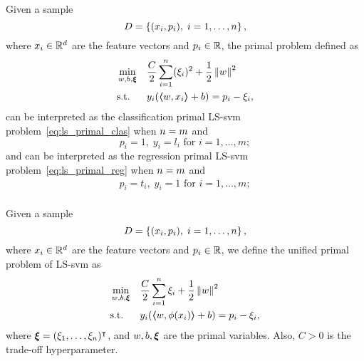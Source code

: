 \begin{lemma}
    Given a sample
    $$ D = \left\{(x_i, p_i), \; i=1, \ldots, n\right\} ,$$
    where $x_i \in \mathbb{R}^d$ are the feature vectors and $p_i \in \mathbb{R}$, 
    the primal problem defined as
    \begin{equation}
        \nonumber
        \begin{aligned}
            &\min_{w, b, \bm{\xi}} & & \frac{C}{2} \sum_{i=1}^n (\xi_i)^2 + \frac{1}{2} \left\lVert w\right\rVert^2 \\
            & \text{s.t.} & & y_i (\bm{\left\langle} w, x_i \bm{\right\rangle} + b) = p_i - \xi_i ,     
        \end{aligned}  
    \end{equation}
    can be interpreted as the classification primal LS-\acrshort{svm} problem~\eqref{eq:ls_primal_clas} when $n=m$ and
    $$ p_i = 1,\; y_i = l_i \text{ for } i=1, \ldots, m ;$$
    and can be interpreted as the regression primal LS-\acrshort{svm} problem~\eqref{eq:ls_primal_reg} when $n = m$ and
    \begin{equation}
        \nonumber
        \begin{aligned}
            p_i = t_i  ,\; y_i = 1 \text{ for } i=1, \ldots, m ; \\
        \end{aligned}
    \end{equation}
\end{lemma}
%
\begin{definition}
    Given a sample
    $$ D = \left\{(x_i, p_i), \; i=1, \ldots, n\right\} ,$$
    where $x_i \in \mathbb{R}^d$ are the feature vectors and $p_i \in \mathbb{R}$, 
    we define the unified primal problem of LS-\acrshort{svm} as
    \begin{equation}
        \label{eq:ls_primal}
        \begin{aligned}
            &\min_{w, b, \fv{\xi}} & & \frac{C}{2} \sum_{i=1}^\nsamples \xi_i + \frac{1}{2} \norm{w}^2 \\
            & \text{s.t.} & & y_i (\dotp{w}{\phi(x_i)} + b) = p_i - \xi_i ,      
        \end{aligned}  
    \end{equation}
    where $\bm{\xi} = (\xi_1, \ldots, \xi_n)^\intercal$, and $w, b, \bm{\xi}$ are the primal variables. Also, $C > 0$ is the trade-off hyperparameter.
\end{definition}
%
